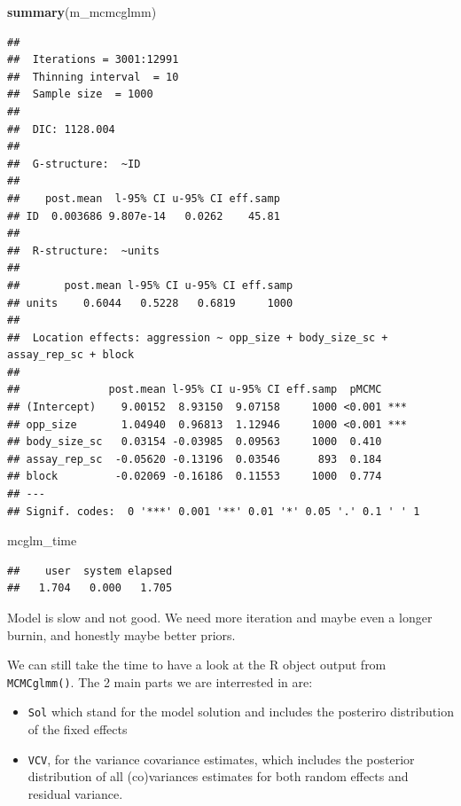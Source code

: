 \documentclass[
  12pt,
]{book}
\newenvironment{Shaded}{\begin{snugshade}}{\end{snugshade}}
\newcommand{\KeywordTok}[1]{\textcolor[rgb]{0.13,0.29,0.53}{\textbf{#1}}}
\newcommand{\NormalTok}[1]{#1}
\providecommand{\tightlist}{%
  \setlength{\itemsep}{0pt}\setlength{\parskip}{0pt}}
\begin{document}
\begin{Shaded}
\begin{Highlighting}[]
\KeywordTok{summary}\NormalTok{(m\_mcmcglmm)}
\end{Highlighting}
\end{Shaded}

\begin{verbatim}
## 
##  Iterations = 3001:12991
##  Thinning interval  = 10
##  Sample size  = 1000 
## 
##  DIC: 1128.004 
## 
##  G-structure:  ~ID
## 
##    post.mean  l-95% CI u-95% CI eff.samp
## ID  0.003686 9.807e-14   0.0262    45.81
## 
##  R-structure:  ~units
## 
##       post.mean l-95% CI u-95% CI eff.samp
## units    0.6044   0.5228   0.6819     1000
## 
##  Location effects: aggression ~ opp_size + body_size_sc + assay_rep_sc + block 
## 
##              post.mean l-95% CI u-95% CI eff.samp  pMCMC    
## (Intercept)    9.00152  8.93150  9.07158     1000 <0.001 ***
## opp_size       1.04940  0.96813  1.12946     1000 <0.001 ***
## body_size_sc   0.03154 -0.03985  0.09563     1000  0.410    
## assay_rep_sc  -0.05620 -0.13196  0.03546      893  0.184    
## block         -0.02069 -0.16186  0.11553     1000  0.774    
## ---
## Signif. codes:  0 '***' 0.001 '**' 0.01 '*' 0.05 '.' 0.1 ' ' 1
\end{verbatim}

\begin{Shaded}
\begin{Highlighting}[]
\NormalTok{mcglm\_time}
\end{Highlighting}
\end{Shaded}

\begin{verbatim}
##    user  system elapsed 
##   1.704   0.000   1.705
\end{verbatim}

Model is slow and not good. We need more iteration and maybe even a longer burnin, and honestly maybe better priors.

We can still take the time to have a look at the R object output from \texttt{MCMCglmm()}. The 2 main parts we are interrested in are:

\begin{itemize}
\tightlist
\item
  \texttt{Sol} which stand for the model solution and includes the posteriro distribution of the fixed effects
\item
  \texttt{VCV}, for the variance covariance estimates, which includes the posterior distribution of all (co)variances estimates for both random effects and residual variance.
\end{itemize}
\end{document}
